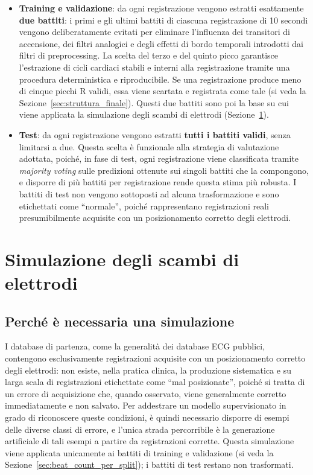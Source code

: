 \begin{itemize}
	\item \textbf{Training e validazione}: da ogni registrazione vengono estratti esattamente \textbf{due battiti}: i primi e gli ultimi battiti di ciascuna registrazione di 10 secondi vengono deliberatamente evitati per eliminare l'influenza dei transitori di accensione, dei filtri analogici e degli effetti di bordo temporali introdotti dai filtri di preprocessing. La scelta del terzo e del quinto picco garantisce l'estrazione di cicli cardiaci stabili e interni alla registrazione tramite una procedura deterministica e riproducibile. Se una registrazione produce meno di cinque picchi R validi, essa viene scartata e registrata come tale (si veda la Sezione~\ref{sec:struttura_finale}). Questi due battiti sono poi la base su cui viene applicata la simulazione degli scambi di elettrodi (Sezione~\ref{sec:simulazione_misplacement}).
	\item \textbf{Test}: da ogni registrazione vengono estratti \textbf{tutti i battiti validi}, senza limitarsi a due. Questa scelta è funzionale alla strategia di valutazione adottata, poiché, in fase di test, ogni registrazione viene classificata tramite \emph{majority voting} sulle predizioni ottenute sui singoli battiti che la compongono, e disporre di più battiti per registrazione rende questa stima più robusta. I battiti di test non vengono sottoposti ad alcuna trasformazione e sono etichettati come ``normale'', poiché rappresentano registrazioni reali presumibilmente acquisite con un posizionamento corretto degli elettrodi.
\end{itemize}

\section{Simulazione degli scambi di elettrodi}
\label{sec:simulazione_misplacement}

\subsection{Perché è necessaria una simulazione}

I database di partenza, come la generalità dei database ECG pubblici, contengono esclusivamente registrazioni acquisite con un posizionamento corretto degli elettrodi: non esiste, nella pratica clinica, la produzione sistematica e su larga scala di registrazioni etichettate come ``mal posizionate'', poiché si tratta di un errore di acquisizione che, quando osservato, viene generalmente corretto immediatamente e non salvato. Per addestrare un modello supervisionato in grado di riconoscere queste condizioni, è quindi necessario disporre di esempi delle diverse classi di errore, e l'unica strada percorribile è la generazione artificiale di tali esempi a partire da registrazioni corrette. Questa simulazione viene applicata unicamente ai battiti di training e validazione (si veda la Sezione~\ref{sec:beat_count_per_split}); i battiti di test restano non trasformati.

